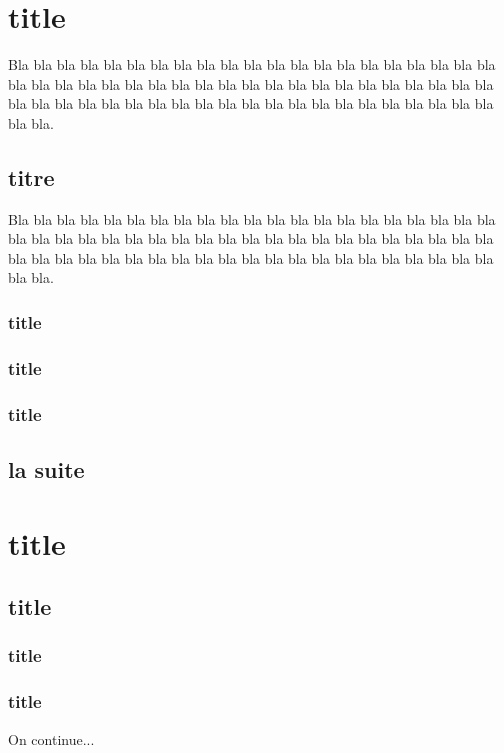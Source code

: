\documentclass[french,a4paper]{book}
\begin{document}
\tableofcontents

\chapter{title}

Bla bla bla bla bla bla bla bla bla bla bla bla bla bla bla bla bla 
bla bla bla bla bla bla bla bla bla bla bla bla bla bla bla bla bla 
bla bla bla bla bla bla bla bla bla bla bla bla bla bla bla bla bla 
bla bla bla bla bla bla bla bla bla bla bla bla bla bla.

	\section{titre}

Bla bla bla bla bla bla bla bla bla bla bla bla bla bla bla bla bla 
bla bla bla bla bla bla bla bla bla bla bla bla bla bla bla bla bla 
bla bla bla bla bla bla bla bla bla bla bla bla bla bla bla bla bla 
bla bla bla bla bla bla bla bla bla bla bla bla bla bla.

		\subsection{title}
		\subsection{title}
		\subsection{title}

	\section{la suite}

\chapter{title}

	\section{title}

		\subsection{title}
		\subsection{title}

On continue...
\end{document}
